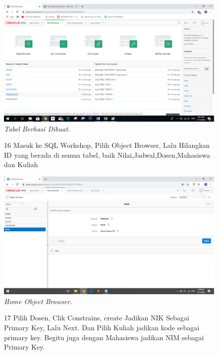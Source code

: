 \begin{enumerate}
\begin{figure}
    \begin{center}
    \includegraphics[scale=0.4]{figures/15.png}
    \caption{\textit{Tabel Berhasi Dibuat.}}
    \end{center}
    \label{gambar}
    \end{figure}

\begin{figure}
\item[16]Masuk ke SQL Workshop, Pilih Object Browser, Lalu Hilangkan ID yang berada di semua tabel, baik Nilai,Jadwal,Dosen,Mahasiswa dan Kuliah

    \begin{center}
    \includegraphics[scale=0.3]{figures/45.png}
    \caption{\textit{Home Object Browser.}}
    \end{center}
    \label{gambar}
    \end{figure}
    
\begin{figure}
\item[17]Pilih Dosen, Clik Constrains, create Jadikan NIK Sebagai Primary Key, Lalu Next. Dan Pilih Kuliah jadikan kode sebagai primary key. Begitu juga dengan Mahasiswa jadikan NIM sebagai Primary Key.


\end{figure}
\end{enumerate}
